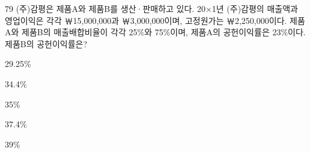\begin{question}{79}
(주)감평은 제품A와 제품B를 생산·판매하고 있다. 20×1년 (주)감평의 매출액과 영업이익은 각각 ￦15,000,000과 ￦3,000,000이며, 고정원가는 ￦2,250,000이다. 제품A와 제품B의 매출배합비율이 각각 25\%와 75\%이며, 제품A의 공헌이익률은 23\%이다. 제품B의 공헌이익률은?
\begin{choices}
  \item 29.25\%
  \item 34.4\%
  \item 35\%
  \item 37.4\%
  \item 39\%
\end{choices}
\end{question}
